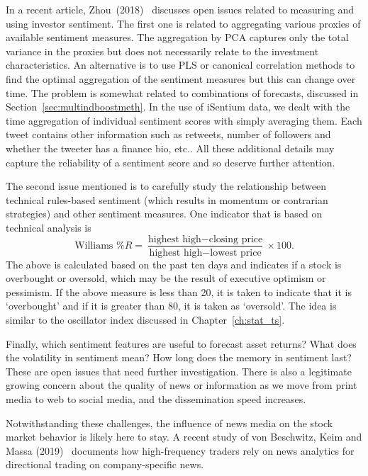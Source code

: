 In a recent article, Zhou~(2018)~\cite{zhou18measure} discusses open issues related to measuring and using investor sentiment. The first one is related to aggregating various proxies of available sentiment measures. The aggregation by PCA captures only the total variance in the proxies but does not necessarily relate to the investment characteristics. An alternative is to use PLS or canonical correlation methods to find the optimal aggregation of the sentiment measures but this can change over time. The problem is somewhat related to combinations of forecasts, discussed in Section~\ref{sec:multindboostmeth}. In the use of iSentium data, we dealt with the time aggregation of individual sentiment scores with simply averaging them. Each tweet contains other information such as retweets, number of followers and whether the tweeter has a finance bio, etc.. All these additional details may capture the reliability of a sentiment score and so deserve further attention. 


The second issue mentioned is to carefully study the relationship between technical rules-based sentiment (which results in momentum or contrarian strategies) and other sentiment measures. One indicator that is based on technical analysis is
	\begin{equation}\label{eqn:williams}
	\text{Williams \% }R= \dfrac{\text{highest high}-\text{closing price}}{\text{highest high}-\text{lowest price}} \times 100.
	\end{equation}
The above is calculated based on the past ten days and indicates if a stock is overbought or oversold, which may be the result of executive optimism or pessimism. If the above measure is less than 20, it is taken to indicate that it is `overbought' and if it is greater than 80, it is taken as `oversold'. The idea is similar to the oscillator index discussed in Chapter~\ref{ch:stat_ts}. 


Finally, which sentiment features are useful to forecast asset returns? What does the volatility in sentiment mean? How long does the memory in sentiment last? These are open issues that need further investigation. There is also a legitimate  growing concern about the quality of news or information as we move from print media to web to social media, and the dissemination speed increases. 

Notwithstanding these challenges, the influence of news media on the stock market behavior is likely here to stay. A recent study of von Beschwitz, Keim and Massa (2019)~\cite{keimmass2019} documents how high-frequency traders rely on news analytics for directional trading on company-specific news.\label{in:newsan2}

